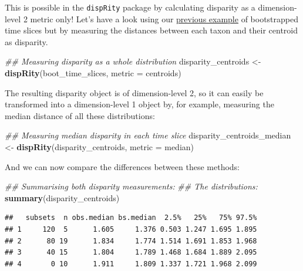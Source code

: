 \documentclass[
]{book}
\newenvironment{Shaded}{\begin{snugshade}}{\end{snugshade}}
\newcommand{\CommentTok}[1]{\textcolor[rgb]{0.56,0.35,0.01}{\textit{#1}}}
\newcommand{\DataTypeTok}[1]{\textcolor[rgb]{0.13,0.29,0.53}{#1}}
\newcommand{\KeywordTok}[1]{\textcolor[rgb]{0.13,0.29,0.53}{\textbf{#1}}}
\newcommand{\NormalTok}[1]{#1}
\newcommand{\StringTok}[1]{\textcolor[rgb]{0.31,0.60,0.02}{#1}}
\begin{document}
This is possible in the \texttt{dispRity} package by calculating disparity as a dimension-level 2 metric only!
Let's have a look using our \protect\hyperlink{summarising-dispRity-data-plots}{previous example} of bootstrapped time slices but by measuring the distances between each taxon and their centroid as disparity.

\begin{Shaded}
\begin{Highlighting}[]
\CommentTok{\#\# Measuring disparity as a whole distribution}
\NormalTok{disparity\_centroids \textless{}{-}}\StringTok{ }\KeywordTok{dispRity}\NormalTok{(boot\_time\_slices, }
                                \DataTypeTok{metric =}\NormalTok{ centroids)}
\end{Highlighting}
\end{Shaded}

The resulting disparity object is of dimension-level 2, so it can easily be transformed into a dimension-level 1 object by, for example, measuring the median distance of all these distributions:

\begin{Shaded}
\begin{Highlighting}[]
\CommentTok{\#\# Measuring median disparity in each time slice}
\NormalTok{disparity\_centroids\_median \textless{}{-}}\StringTok{ }\KeywordTok{dispRity}\NormalTok{(disparity\_centroids,}
                                       \DataTypeTok{metric =}\NormalTok{ median)}
\end{Highlighting}
\end{Shaded}

And we can now compare the differences between these methods:

\begin{Shaded}
\begin{Highlighting}[]
\CommentTok{\#\# Summarising both disparity measurements:}
\CommentTok{\#\# The distributions:}
\KeywordTok{summary}\NormalTok{(disparity\_centroids)}
\end{Highlighting}
\end{Shaded}

\begin{verbatim}
##   subsets  n obs.median bs.median  2.5%   25%   75% 97.5%
## 1     120  5      1.605     1.376 0.503 1.247 1.695 1.895
## 2      80 19      1.834     1.774 1.514 1.691 1.853 1.968
## 3      40 15      1.804     1.789 1.468 1.684 1.889 2.095
## 4       0 10      1.911     1.809 1.337 1.721 1.968 2.099
\end{verbatim}
\end{document}
